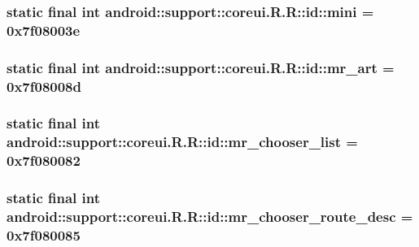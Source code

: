 \hypertarget{classandroid_1_1support_1_1coreui_1_1_r_1_1id_4e294844b614bf91245b528c52f1a8d3}{
\subsubsection[{mini}]{\setlength{\rightskip}{0pt plus 5cm}static final int android::support::coreui.R.R::id::mini = 0x7f08003e}}
\label{classandroid_1_1support_1_1coreui_1_1_r_1_1id_4e294844b614bf91245b528c52f1a8d3}


\hypertarget{classandroid_1_1support_1_1coreui_1_1_r_1_1id_337331325a2841330d7b4d9515056e16}{
\subsubsection[{mr\_\-art}]{\setlength{\rightskip}{0pt plus 5cm}static final int android::support::coreui.R.R::id::mr\_\-art = 0x7f08008d}}
\label{classandroid_1_1support_1_1coreui_1_1_r_1_1id_337331325a2841330d7b4d9515056e16}


\hypertarget{classandroid_1_1support_1_1coreui_1_1_r_1_1id_5a9dd991356eda856512a2ebba92dc5c}{
\subsubsection[{mr\_\-chooser\_\-list}]{\setlength{\rightskip}{0pt plus 5cm}static final int android::support::coreui.R.R::id::mr\_\-chooser\_\-list = 0x7f080082}}
\label{classandroid_1_1support_1_1coreui_1_1_r_1_1id_5a9dd991356eda856512a2ebba92dc5c}


\hypertarget{classandroid_1_1support_1_1coreui_1_1_r_1_1id_e0bb64e33051892cf708fd4ccf06f25b}{
\subsubsection[{mr\_\-chooser\_\-route\_\-desc}]{\setlength{\rightskip}{0pt plus 5cm}static final int android::support::coreui.R.R::id::mr\_\-chooser\_\-route\_\-desc = 0x7f080085}}
\label{classandroid_1_1support_1_1coreui_1_1_r_1_1id_e0bb64e33051892cf708fd4ccf06f25b}


